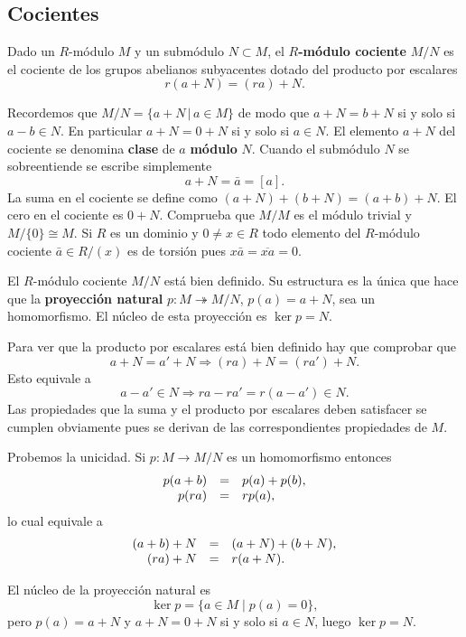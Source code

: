 \hypertarget{cocientes}{%
\subsection{Cocientes}\label{cocientes}}


Dado un \(R\)-módulo \(M\) y un submódulo \(N\subset M\), el
\textbf{\(R\)-módulo cociente} \(M/N\) es el cociente de los grupos
abelianos subyacentes dotado del producto por escalares
\[r(a+N)=(ra)+N.\] 


Recordemos que \(M/N=\{a+N\,|\, a\in M\}\) de modo que \(a+N=b+N\) si
y solo si \(a-b\in N\). En particular \(a+N=0+N\) si y solo si
\(a\in N\). El elemento \(a+N\) del cociente se denomina \textbf{clase}
de \(a\) \textbf{módulo} \(N\). Cuando el submódulo \(N\) se
sobreentiende se escribe simplemente \[a+N=\bar a=[a].\] La suma en el
cociente se define como \((a+N)+(b+N)=(a+b)+N\). El cero en el cociente
es \(0+N\). Comprueba que \(M/M\) es el módulo trivial y
\(M/\{0\}\cong M\). Si \(R\) es un dominio y \(0\neq x\in R\) todo
elemento del \(R\)-módulo cociente \(\bar a\in R/(x)\) es de torsión
pues \(x\bar a=\overline{xa}=0\). 


El \(R\)-módulo cociente \(M/N\) está bien definido. Su estructura es la
única que hace que la \textbf{proyección natural}
\(p\colon M\twoheadrightarrow M/N\), \(p(a)=a+N\), sea un homomorfismo.
El núcleo de esta proyección es \(\ker p=N\). 


Para ver que la producto por escalares está bien definido hay que
comprobar que \[
a+N=a'+N\Rightarrow(ra)+N=(ra')+N.
\] Esto equivale a \[
a-a'\in N\Rightarrow ra-ra'= r(a-a')\in N.
\] Las propiedades que la suma y el producto por escalares deben
satisfacer se cumplen obviamente pues se derivan de las correspondientes
propiedades de \(M\).

Probemos la unicidad. Si \(p\colon M\rightarrow M/N\) es un homomorfismo
entonces \[\begin{array}{rcl}
p(a+b)&=&p(a)+p(b),\cr p(ra)&=&rp(a),
\end{array}\] lo cual equivale a \[\begin{array}{rcl}
(a+b)+N&=&(a+N)+(b+N),\cr (ra)+N&=&r(a+N).
\end{array}\]

El núcleo de la proyección natural es
\[\ker p =\{a\in M\;|\; p(a)=0\},\] pero \(p(a)=a+N\) y \(a+N=0+N\) si
y solo si \(a\in N\), luego \(\ker p=N\).\\

